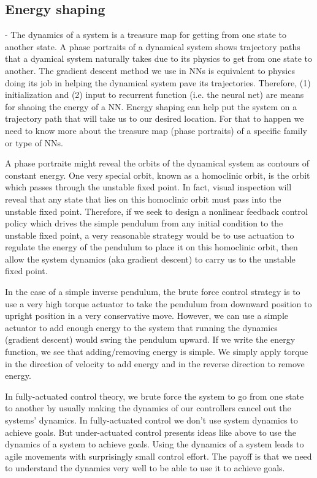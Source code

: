 \documentclass[aps,preprint,showpacs,superscriptaddress,groupedaddress]{revtex4}  %
\begin{document}
\subsection{Energy shaping}

- The dynamics of a system is a treasure map for getting from one state to another state. A phase portraits of a dynamical system shows  trajectory paths that a dyamical system naturally takes due to its physics to get from one state to another. The gradient descent method we use in NNs is equivalent to physics doing its job in helping the dynamical system pave its trajectories. Therefore, (1) initialization and (2) input to recurrent function (i.e. the neural net)  are means for shaoing the energy of a NN. Energy shaping can help put the system on a trajectory path that will take us to our desired location. For that to happen we need to know more about the treasure map (phase portraits) of a specific family or type of NNs.

A phase portraite might reveal the orbits of the dynamical system as contours of constant energy. One very special orbit, known as a homoclinic orbit, is the orbit which passes through the unstable fixed point. In fact, visual inspection will reveal that any state that lies on this homoclinic orbit must pass into the unstable fixed point. Therefore, if we seek to design a nonlinear feedback control policy which drives the simple pendulum from any initial condition to the unstable fixed point, a very reasonable strategy would be to use actuation to regulate the energy of the pendulum to place it on this homoclinic orbit, then allow the system dynamics (aka gradient descent) to carry us to the unstable fixed point. 

In the case of a simple inverse pendulum, the brute force control strategy is to use a very high torque actuator to take the pendulum from downward position to upright position in a very conservative move. However, we can use a simple actuator to add enough energy to the system that running the dynamics (gradient descent) would swing the pendulum upward. If we write the energy function, we see that adding/removing energy is simple. We simply apply torque in the direction of velocity to add energy and in the reverse direction to remove energy.


In fully-actuated control theory, we brute force the system to go from one state to another by usually making the dynamics of our controllers cancel out the systems' dynamics. In fully-actuated control we don't use system dynamics to achieve goals. But under-actuated control presents ideas like above to use the dynamics of a system to achieve goals. Using the dynamics of a system leads to agile movements with surprisingly small control effort. The payoff is that we need to understand the dynamics very well to be able to use it to achieve goals. 
\end{document}

